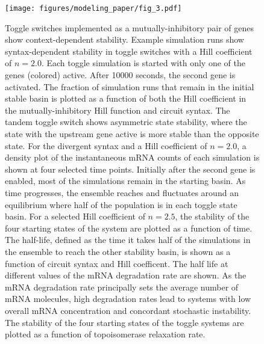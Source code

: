 \documentclass[11pt]{article}
\begin{document}
\begin{figure}[h]
    \centering
    {\texttt{[image: figures/modeling\_paper/fig\_3.pdf]}
    \label{fig:toggle_orientation_examples}
    \label{fig:toggle_basin_stability}
    \label{fig:toggle_basin_stability_over_time}
    \label{fig:toggle_stable_frac_n_2.5}
    \label{fig:toggle_half_life_vs_hill}
    \label{fig:toggle_half_life_vs_mRNA_deg}
    \label{fig:toggle_vs_topo_rate}
    }
\end{figure}
\begin{figure}[h]
    \ContinuedFloat
    \caption{Toggle switches implemented as a mutually-inhibitory pair of genes show context-dependent stability.
         Example simulation runs show syntax-dependent stability in toggle switches with a Hill coefficient of \(n = 2.0\). Each toggle simulation is started with only one of the genes (colored) active. After 10000 seconds, the second gene is activated.
         The fraction of simulation runs that remain in the initial stable basin is plotted as a function of both the Hill coefficient in the mutually-inhibitory Hill function and circuit syntax. The tandem toggle switch shows asymmetric state stability, where the state with the upstream gene active is more stable than the opposite state.
         For the divergent syntax and a Hill coefficient of \(n = 2.0\), a density plot of the instantaneous mRNA counts of each simulation is shown at four selected time points. Initially after the second gene is enabled, most of the simulations remain in the starting basin. As time progresses, the ensemble reaches and fluctuates around an equilibrium where half of the population is in each toggle state basin.
         For a selected Hill coefficient of \(n = 2.5\), the stability of the four starting states of the system are plotted as a function of time.
         The half-life, defined as the time it takes half of the simulations in the ensemble to reach the other stability basin, is shown as a function of circuit syntax and Hill coefficent.
         The half life at different values of the mRNA degradation rate are shown. As the mRNA degradation rate principally sets the average number of mRNA molecules, high degradation rates lead to systems with low overall mRNA concentration and concordant stochastic instability.
         The stability of the four starting states of the toggle systems are plotted as a function of topoisomerase relaxation rate.
    } \label{fig:top:toggle_switch}
\end{figure}
\end{document}
